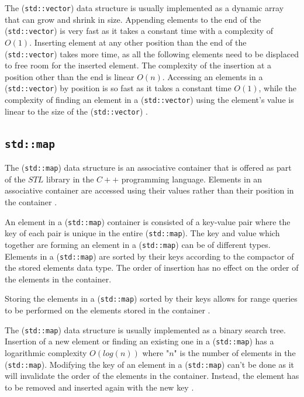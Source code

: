 {The (\texttt{std::vector}) data structure is usually implemented as a dynamic array that can grow and shrink in size. Appending elements to the end of the (\texttt{std::vector}) is very fast as it takes a constant time with a complexity of $O(1)$. Inserting element at any other position than the end of the (\texttt{std::vector}) takes more time, as all the following elements need to be displaced to free room for the inserted element. The complexity of the insertion at a position other than the end is linear $O(n)$.  Accessing an elements in a (\texttt{std::vector}) by position is so fast as it takes a constant time $O(1)$, while the complexity of finding an element in a (\texttt{std::vector}) using the element's value is linear to the size of the (\texttt{std::vector}) \cite{josuttis2012c++}.

\subsection{\texttt{std::map}}
\label{subsec:map}

The (\texttt{std::map}) data structure is an associative container that is offered as part of the $STL$ library in the $C++$ programming language. Elements in an associative container are accessed using their values rather than their position in the container \cite{josuttis2012c++}.

An element in a (\texttt{std::map}) container is consisted of a key-value pair where the key of each pair is unique in the entire (\texttt{std::map}). The key and value which together are forming an element in a (\texttt{std::map}) can be of different types. Elements in a (\texttt{std::map}) are sorted by their keys according to the compactor of the stored elements data type. The order of insertion has no effect on the order of the elements in the container. 

Storing the elements in a (\texttt{std::map}) sorted by their keys allows for range queries to be performed on the elements stored in the container \cite{josuttis2012c++}. 

The (\texttt{std::map}) data structure is usually implemented as a binary search tree. Insertion of a new element or finding an existing one in a (\texttt{std::map}) has a logarithmic complexity $O(log(n))$ where "$n$" is the number of elements in the (\texttt{std::map}). Modifying the key of an element in a (\texttt{std::map}) can't be done as it will invalidate the order of the elements in the container. Instead, the element has to be removed and inserted again with the new key \cite{josuttis2012c++}.

}
